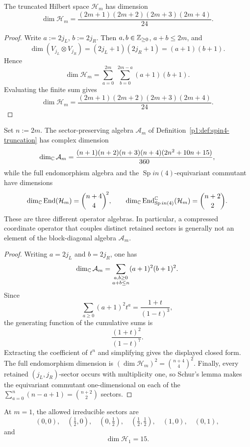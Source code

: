 \documentclass[11pt]{article}
\begin{document}
\begin{proposition}
\label{p1:prop:dimHm}
The truncated Hilbert space \(\mathcal H_m\) has dimension
\[
\dim\mathcal H_m
=
\frac{(2m+1)(2m+2)(2m+3)(2m+4)}{24}.
\]
\end{proposition}

\begin{proof}
Write \(a:=2j_L\), \(b:=2j_R\). Then \(a,b\in\mathbb{Z}_{\ge0}\), \(a+b\le 2m\), and
\[
\dim(V_{j_L}\otimes V_{j_R})=(2j_L+1)(2j_R+1)=(a+1)(b+1).
\]
Hence
\[
\dim\mathcal H_m=\sum_{a=0}^{2m}\ \sum_{b=0}^{2m-a}(a+1)(b+1).
\]
Evaluating the finite sum gives
\[
\dim\mathcal H_m=\frac{(2m+1)(2m+2)(2m+3)(2m+4)}{24}.
\]
\end{proof}

\begin{proposition}
\label{p1:prop:block-algebra-dimensions}
Set \(n:=2m\).  The sector-preserving algebra
\(\mathcal A_m\) of Definition~\ref{p1:def:spin4-truncation} has complex
dimension
\[
\dim_{\mathbb{C}}\mathcal A_m
=
\frac{(n+1)(n+2)(n+3)(n+4)(2n^2+10n+15)}{360},
\]
while the full endomorphism algebra and the \(\operatorname{Sp}in(4)\)-equivariant
commutant have dimensions
\[
\dim_{\mathbb{C}}\operatorname{End}(\mathcal H_m)=\binom{n+4}{4}^{\!2},
\qquad
\dim_{\mathbb{C}}\operatorname{End}_{\operatorname{Sp}in(4)}^{\mathbb{C}}(\mathcal H_m)
=\binom{n+2}{2}.
\]
These are three different operator algebras.  In particular, a compressed
coordinate operator that couples distinct retained sectors is generally not
an element of the block-diagonal algebra \(\mathcal A_m\).
\end{proposition}

\begin{proof}
Writing \(a=2j_L\) and \(b=2j_R\), one has
\[
\dim_{\mathbb{C}}\mathcal A_m
=\sum_{\substack{a,b\ge0\\a+b\le n}}(a+1)^2(b+1)^2.
\]
Since
\[
\sum_{a\ge0}(a+1)^2t^a=\frac{1+t}{(1-t)^3},
\]
the generating function of the cumulative sums is
\[
\frac{(1+t)^2}{(1-t)^7}.
\]
Extracting the coefficient of \(t^n\) and simplifying gives the displayed
closed form.  The full endomorphism dimension is
\((\dim\mathcal H_m)^2=\binom{n+4}{4}^2\).  Finally, every retained
\((j_L,j_R)\)-sector occurs with multiplicity one, so Schur's lemma makes the
equivariant commutant one-dimensional on each of the
\(\sum_{a=0}^n(n-a+1)=\binom{n+2}{2}\) sectors.
\end{proof}

\begin{corollary}
\label{p1:cor:H1-structure}
At \(m=1\), the allowed irreducible sectors are
\[
(0,0),\quad (\tfrac12,0),\quad (0,\tfrac12),\quad (\tfrac12,\tfrac12),\quad (1,0),\quad (0,1),
\]
and
\[
\dim \mathcal H_1=15.
\]
\end{corollary}
\end{document}
